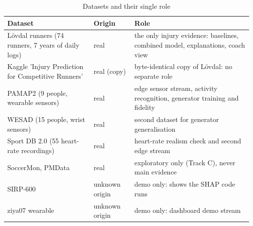 \begin{table}[htbp]\centering\caption{Datasets and their single role}\label{tab:data}
\small\begin{tabular}{p{4.1cm}p{1.9cm}p{8.5cm}}\toprule
Dataset & Origin & Role \\\midrule
Lövdal runners (74 runners, 7 years of daily logs) & real & the only injury evidence: baselines, combined model, explanations, coach view \\
Kaggle 'Injury Prediction for Competitive Runners' & real (copy) & byte-identical copy of Lövdal: no separate role \\
PAMAP2 (9 people, wearable sensors) & real & edge sensor stream, activity recognition, generator training and fidelity \\
WESAD (15 people, wrist sensors) & real & second dataset for generator generalisation \\
Sport DB 2.0 (55 heart-rate recordings) & real & heart-rate realism check and second edge stream \\
SoccerMon, PMData & real & exploratory only (Track C), never main evidence \\
SIRP-600 & unknown origin & demo only: shows the SHAP code runs \\
ziya07 wearable & unknown origin & demo only: dashboard demo stream \\
\bottomrule\end{tabular}\end{table}
